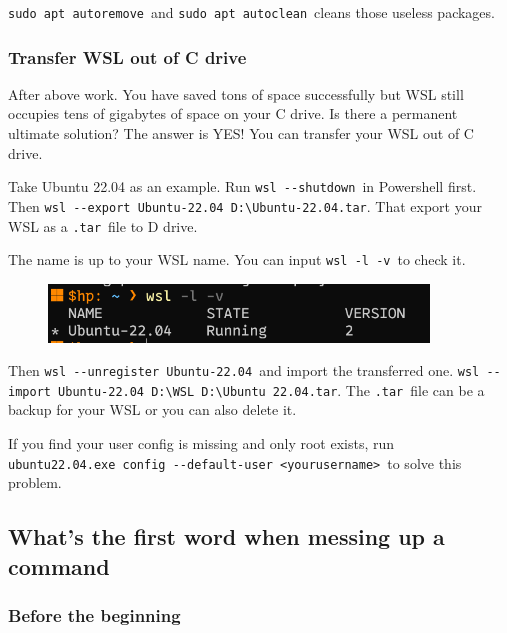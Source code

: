 \documentclass[12pt]{ctexart}
\newenvironment{mdquote}
{%
  \par\noindent
  \begin{list}{}{%
      \setlength{\leftmargin}{1em}%
      \setlength{\rightmargin}{0pt}%
      \setlength{\itemindent}{0pt}%
      \setlength{\listparindent}{\parindent}%
      \setlength{\topsep}{0.5\baselineskip}%
  }
  \item[\textbf{>}\ ]\itshape
}
{\end{list}\par}
\begin{document}
\texttt{sudo\ apt\ autoremove}\ and \texttt{sudo\ apt\ autoclean}\ cleans
those useless packages.

\subsubsection{\textbf{Transfer WSL out of C drive}}

After above work. You have saved tons of space successfully but WSL
still occupies tens of gigabytes of space on your C drive. Is there a
permanent ultimate solution? The answer is YES! You can transfer your
WSL out of C drive.

Take Ubuntu 22.04 as an example. Run \texttt{wsl\ -\/-shutdown}\ in
Powershell first. Then
\texttt{wsl\ -\/-export\ Ubuntu-22.04\ D:\textbackslash{}Ubuntu-22.04.tar}.
That export your WSL as a \texttt{.tar}\ file to D drive.

\begin{mdquote}
The name is up to your WSL name. You can input \texttt{wsl\ -l\ -v}\ to
check it.
\begin{figure}[H]
    \centering
    \includegraphics[width=0.9\textwidth,keepaspectratio]{assets/Linux/2.4 No, the C drive is almost full!/2.png}
\end{figure}
\end{mdquote}

Then \texttt{wsl\ -\/-unregister\ Ubuntu-22.04}\ and import the
transferred one.
\texttt{wsl\ -\/-import\ Ubuntu-22.04\ D:\textbackslash{}WSL\ D:\textbackslash{}Ubuntu\ 22.04.tar}.
The \texttt{.tar}\ file can be a backup for your WSL or you can also
delete it.

If you find your user config is missing and only root exists, run
\texttt{ubuntu22.04.exe\ config\ -\/-default-user\ \textless{}yourusername\textgreater{}}\
to solve this problem.

\newpage
\subsection{\textbf{What's the first word when messing up a command}}

\subsubsection{\textbf{Before the beginning}}
\end{document}

